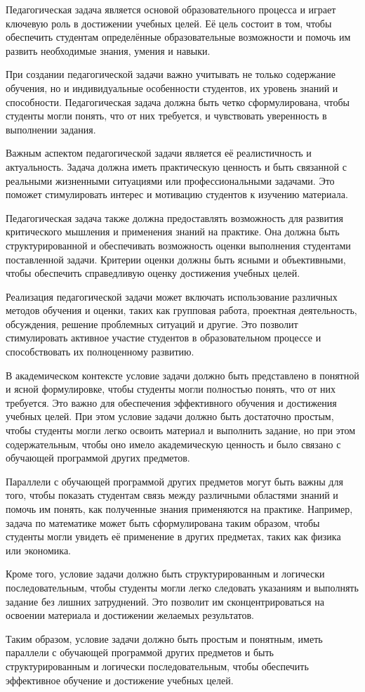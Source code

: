 
Педагогическая задача является основой образовательного процесса и играет ключевую роль в достижении учебных целей. Её цель состоит в том, чтобы обеспечить студентам определённые образовательные возможности и помочь им развить необходимые знания, умения и навыки.

При создании педагогической задачи важно учитывать не только содержание обучения, но и индивидуальные особенности студентов, их уровень знаний и способности. Педагогическая задача должна быть четко сформулирована, чтобы студенты могли понять, что от них требуется, и чувствовать уверенность в выполнении задания.

Важным аспектом педагогической задачи является её реалистичность и актуальность. Задача должна иметь практическую ценность и быть связанной с реальными жизненными ситуациями или профессиональными задачами. Это поможет стимулировать интерес и мотивацию студентов к изучению материала.

Педагогическая задача также должна предоставлять возможность для развития критического мышления и применения знаний на практике. Она должна быть структурированной и обеспечивать возможность оценки выполнения студентами поставленной задачи. Критерии оценки должны быть ясными и объективными, чтобы обеспечить справедливую оценку достижения учебных целей.

Реализация педагогической задачи может включать использование различных методов обучения и оценки, таких как групповая работа, проектная деятельность, обсуждения, решение проблемных ситуаций и другие. Это позволит стимулировать активное участие студентов в образовательном процессе и способствовать их полноценному развитию.


В академическом контексте условие задачи должно быть представлено в понятной и ясной формулировке, чтобы студенты могли полностью понять, что от них требуется. Это важно для обеспечения эффективного обучения и достижения учебных целей. При этом условие задачи должно быть достаточно простым, чтобы студенты могли легко освоить материал и выполнить задание, но при этом содержательным, чтобы оно имело академическую ценность и было связано с обучающей программой других предметов.

Параллели с обучающей программой других предметов могут быть важны для того, чтобы показать студентам связь между различными областями знаний и помочь им понять, как полученные знания применяются на практике. Например, задача по математике может быть сформулирована таким образом, чтобы студенты могли увидеть её применение в других предметах, таких как физика или экономика.

Кроме того, условие задачи должно быть структурированным и логически последовательным, чтобы студенты могли легко следовать указаниям и выполнять задание без лишних затруднений. Это позволит им сконцентрироваться на освоении материала и достижении желаемых результатов.

Таким образом, условие задачи должно быть простым и понятным, иметь параллели с обучающей программой других предметов и быть структурированным и логически последовательным, чтобы обеспечить эффективное обучение и достижение учебных целей.
